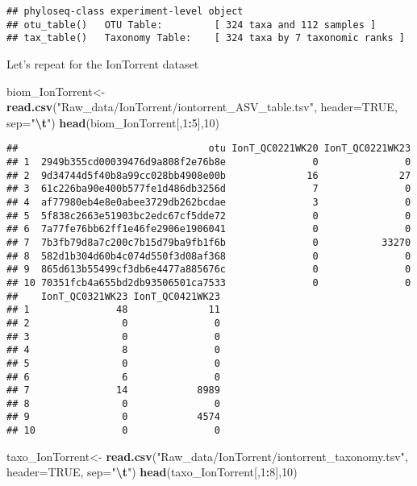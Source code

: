 \documentclass[
]{article}
\newenvironment{Shaded}{\begin{snugshade}}{\end{snugshade}}
\newcommand{\AttributeTok}[1]{\textcolor[rgb]{0.13,0.29,0.53}{#1}}
\newcommand{\ConstantTok}[1]{\textcolor[rgb]{0.56,0.35,0.01}{#1}}
\newcommand{\DecValTok}[1]{\textcolor[rgb]{0.00,0.00,0.81}{#1}}
\newcommand{\FunctionTok}[1]{\textcolor[rgb]{0.13,0.29,0.53}{\textbf{#1}}}
\newcommand{\NormalTok}[1]{#1}
\newcommand{\OtherTok}[1]{\textcolor[rgb]{0.56,0.35,0.01}{#1}}
\newcommand{\SpecialCharTok}[1]{\textcolor[rgb]{0.81,0.36,0.00}{\textbf{#1}}}
\newcommand{\StringTok}[1]{\textcolor[rgb]{0.31,0.60,0.02}{#1}}
\begin{document}
\begin{verbatim}
## phyloseq-class experiment-level object
## otu_table()   OTU Table:         [ 324 taxa and 112 samples ]
## tax_table()   Taxonomy Table:    [ 324 taxa by 7 taxonomic ranks ]
\end{verbatim}

Let's repeat for the IonTorrent dataset

\begin{Shaded}
\begin{Highlighting}[]
\NormalTok{biom\_IonTorrent}\OtherTok{\textless{}{-}} \FunctionTok{read.csv}\NormalTok{(}\StringTok{"Raw\_data/IonTorrent/iontorrent\_ASV\_table.tsv"}\NormalTok{, }
                        \AttributeTok{header=}\ConstantTok{TRUE}\NormalTok{, }\AttributeTok{sep=}\StringTok{"}\SpecialCharTok{\textbackslash{}t}\StringTok{"}\NormalTok{)}
\FunctionTok{head}\NormalTok{(biom\_IonTorrent[,}\DecValTok{1}\SpecialCharTok{:}\DecValTok{5}\NormalTok{],}\DecValTok{10}\NormalTok{)}
\end{Highlighting}
\end{Shaded}

\begin{verbatim}
##                                 otu IonT_QC0221WK20 IonT_QC0221WK23
## 1  2949b355cd00039476d9a808f2e76b8e               0               0
## 2  9d34744d5f40b8a99cc028bb4908e00b              16              27
## 3  61c226ba90e400b577fe1d486db3256d               7               0
## 4  af77980eb4e8e0abee3729db262bcdae               3               0
## 5  5f838c2663e51903bc2edc67cf5dde72               0               0
## 6  7a77fe76bb62ff1e46fe2906e1906041               0               0
## 7  7b3fb79d8a7c200c7b15d79ba9fb1f6b               0           33270
## 8  582d1b304d60b4c074d550f3d08af368               0               0
## 9  865d613b55499cf3db6e4477a885676c               0               0
## 10 70351fcb4a655bd2db93506501ca7533               0               0
##    IonT_QC0321WK23 IonT_QC0421WK23
## 1               48              11
## 2                0               0
## 3                0               0
## 4                8               0
## 5                0               0
## 6                6               0
## 7               14            8989
## 8                0               0
## 9                0            4574
## 10               0               0
\end{verbatim}

\begin{Shaded}
\begin{Highlighting}[]
\NormalTok{taxo\_IonTorrent}\OtherTok{\textless{}{-}} \FunctionTok{read.csv}\NormalTok{(}\StringTok{"Raw\_data/IonTorrent/iontorrent\_taxonomy.tsv"}\NormalTok{, }
                        \AttributeTok{header=}\ConstantTok{TRUE}\NormalTok{, }\AttributeTok{sep=}\StringTok{"}\SpecialCharTok{\textbackslash{}t}\StringTok{"}\NormalTok{)}
\FunctionTok{head}\NormalTok{(taxo\_IonTorrent[,}\DecValTok{1}\SpecialCharTok{:}\DecValTok{8}\NormalTok{],}\DecValTok{10}\NormalTok{)}
\end{Highlighting}
\end{Shaded}
\end{document}
